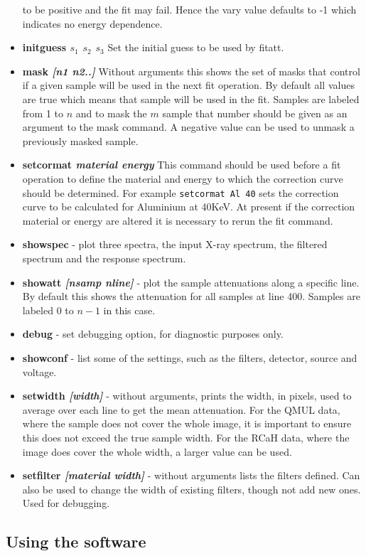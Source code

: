 \documentclass[a4paper]{article}
\begin{document}
\begin{itemize}
to be positive and the fit may fail. Hence the vary value defaults to -1 which indicates no energy dependence.
\item{\bf initguess \it{$s_1$ $s_2$ $s_3$}} Set the initial guess to be used by fitatt.
\item{\bf mask \it{[n1 n2..]}} Without arguments this shows the set of masks that control if a given sample will be used in the next fit operation.
By default all values are true which means that sample will be used in the fit. Samples are labeled from 1 to $n$ and to mask the $m$ sample
that number should be given as an argument to the mask command. A negative value can be used to unmask a previously masked sample.
\item{\bf setcormat \it{material energy}} This command should be used before a fit operation to define the material and energy to which the correction
curve should be determined. For example \texttt{setcormat Al 40} sets the correction curve to be calculated for Aluminium at 40KeV.
At present if the correction material or energy are altered it is necessary to rerun the fit command.
\item{\bf showspec} - plot three spectra, the input X-ray spectrum, the filtered spectrum and the response spectrum.
\item{\bf showatt \it[nsamp nline]} - plot the sample attenuations along a specific line. By default this shows the
attenuation for all samples at line 400. Samples are labeled 0 to $n-1$ in this case.
\item{\bf debug} - set debugging option, for diagnostic purposes only.
\item{\bf showconf} - list some of the settings, such as the filters, detector, source and voltage.
\item{\bf setwidth \it[width]} - without arguments, prints the width, in pixels, used to average over each line to get the mean
attenuation. For the QMUL data, where the sample does not cover the whole image, it is important to ensure this does not
exceed the true sample width. For the RCaH data, where the image does cover the whole width, a larger value can be used.
\item{\bf setfilter \it[material width]} - without arguments lists the filters defined. Can also be used
to change the width of existing filters, though not add new ones. Used for debugging.

\end{itemize}

\subsection{Using the software}
\end{document}
